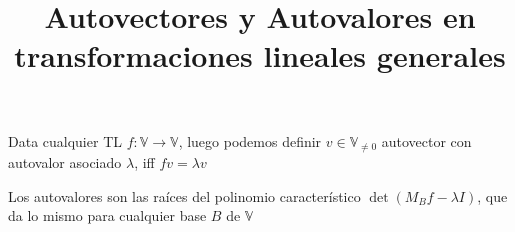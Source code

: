 \documentclass{article}
\title{Autovectores y Autovalores en transformaciones lineales generales}
\def\V{\mathbb{V}}
\begin{document}
Data cualquier TL $f : \V \to \V$, luego podemos definir $v \in \V_{\neq 0}$
autovector con autovalor asociado $\lambda$, iff $f v = \lambda v$

Los autovalores son las raíces del polinomio característico $\det (M_Bf -
\lambda I)$, que da lo mismo para cualquier base $B$ de $\V$
\end{document}
